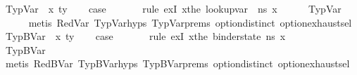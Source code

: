 \begin{isabellebody}
\isamarkupfalse%
\ {\isacharparenleft}{\kern0pt}TypVar\ {\isasymDelta}\ x\ ty{\isacharparenright}{\kern0pt}\isanewline
\ \ \isamarkupfalse%
\ {\isacharquery}{\kern0pt}case\ \isanewline
\ \ \ \ \isamarkupfalse%
\ {\isacharparenleft}{\kern0pt}rule\ exI{\isacharbrackleft}{\kern0pt}\ {\isacharquery}{\kern0pt}x{\isacharequal}{\kern0pt}{\isachardoublequoteopen}the\ {\isacharparenleft}{\kern0pt}lookup{\isacharunderscore}{\kern0pt}var\ {\isasymLambda}\ n{\isacharunderscore}{\kern0pt}s\ x{\isacharparenright}{\kern0pt}{\isachardoublequoteclose}{\isacharbrackright}{\kern0pt}{\isacharparenright}{\kern0pt}\isanewline
\ \ \ \ \isamarkupfalse%
\ TypVar{\isacharparenleft}{\kern0pt}{}{\isacharparenright}{\kern0pt}\ \isanewline
\ \ \ \ \isamarkupfalse%
\ {\isacharparenleft}{\kern0pt}metis\ RedVar\ TypVar{\isachardot}{\kern0pt}hyps\ TypVar{\isachardot}{\kern0pt}prems{\isacharparenleft}{\kern0pt}{}{\isacharparenright}{\kern0pt}\ option{\isachardot}{\kern0pt}distinct{\isacharparenleft}{\kern0pt}{}{\isacharparenright}{\kern0pt}\ option{\isachardot}{\kern0pt}exhaust{\isacharunderscore}{\kern0pt}sel{\isacharparenright}{\kern0pt}\isanewline
{}\isamarkupfalse%
\isanewline
{}\isamarkupfalse%
\ {\isacharparenleft}{\kern0pt}TypBVar\ {\isasymDelta}\ x\ ty{\isacharparenright}{\kern0pt}\isanewline
\ \ \isamarkupfalse%
\ {\isacharquery}{\kern0pt}case\ \isanewline
\ \ \ \ \isamarkupfalse%
\ {\isacharparenleft}{\kern0pt}rule\ exI{\isacharbrackleft}{\kern0pt}\ {\isacharquery}{\kern0pt}x{\isacharequal}{\kern0pt}{\isachardoublequoteopen}the\ {\isacharparenleft}{\kern0pt}binder{\isacharunderscore}{\kern0pt}state\ n{\isacharunderscore}{\kern0pt}s\ x{\isacharparenright}{\kern0pt}{\isachardoublequoteclose}{\isacharbrackright}{\kern0pt}{\isacharparenright}{\kern0pt}\isanewline
\ \ \ \ \isamarkupfalse%
\ TypBVar{\isacharparenleft}{\kern0pt}{}{\isacharparenright}{\kern0pt}\isanewline
\ \ \ \ \isamarkupfalse%
\ {\isacharparenleft}{\kern0pt}metis\ RedBVar\ TypBVar{\isachardot}{\kern0pt}hyps\ TypBVar{\isachardot}{\kern0pt}prems{\isacharparenleft}{\kern0pt}{}{\isacharparenright}{\kern0pt}\ option{\isachardot}{\kern0pt}distinct{\isacharparenleft}{\kern0pt}{}{\isacharparenright}{\kern0pt}\ option{\isachardot}{\kern0pt}exhaust{\isacharunderscore}{\kern0pt}sel{\isacharparenright}{\kern0pt}\isanewline

\end{isabellebody}
